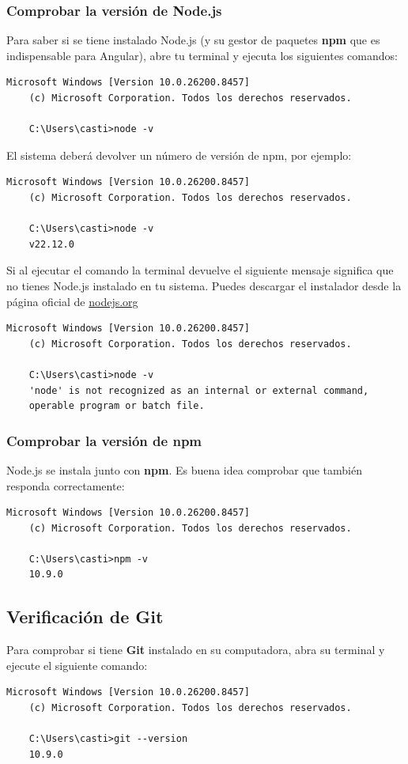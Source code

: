 \documentclass[
10pt, %
a4paper, %
oneside, %
headinclude,footinclude, %
BCOR5mm, %
]{scrartcl}
\begin{document}
\subsubsection{Comprobar la versión de Node.js}
Para saber si se tiene instalado Node.js (y su gestor de paquetes \textbf{npm} que es indispensable para Angular), abre tu terminal y ejecuta los siguientes comandos:

\begin{lstlisting}[language=DOS]
	Microsoft Windows [Version 10.0.26200.8457]
	(c) Microsoft Corporation. Todos los derechos reservados.
	
	C:\Users\casti>node -v
\end{lstlisting}

El sistema deberá devolver un número de versión de npm, por ejemplo:
\begin{lstlisting}[language=DOS]
	Microsoft Windows [Version 10.0.26200.8457]
	(c) Microsoft Corporation. Todos los derechos reservados.
	
	C:\Users\casti>node -v
	v22.12.0
\end{lstlisting}

Si al ejecutar el comando la terminal devuelve el siguiente mensaje significa que no tienes Node.js instalado en tu sistema. Puedes descargar el instalador desde la página oficial de \href{https://nodejs.org/en}{nodejs.org}
\begin{lstlisting}[language=DOS]
	Microsoft Windows [Version 10.0.26200.8457]
	(c) Microsoft Corporation. Todos los derechos reservados.
	
	C:\Users\casti>node -v
	'node' is not recognized as an internal or external command,
	operable program or batch file.
\end{lstlisting}

\subsubsection{Comprobar la versión de npm}
Node.js se instala junto con \textbf{npm}. Es buena idea comprobar que también responda correctamente:
\begin{lstlisting}[language=DOS]
	Microsoft Windows [Version 10.0.26200.8457]
	(c) Microsoft Corporation. Todos los derechos reservados.
	
	C:\Users\casti>npm -v
	10.9.0
\end{lstlisting}

\subsection{Verificación de Git}
Para comprobar si tiene \textbf{Git} instalado en su computadora, abra su terminal y ejecute el siguiente comando:
\begin{lstlisting}[language=DOS]
	Microsoft Windows [Version 10.0.26200.8457]
	(c) Microsoft Corporation. Todos los derechos reservados.
	
	C:\Users\casti>git --version
	10.9.0
\end{lstlisting}
\end{document}
